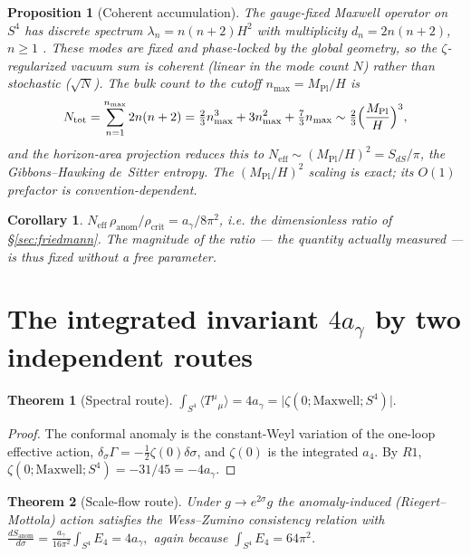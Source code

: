 \documentclass[11pt,a4paper]{article}
\newtheorem{theorem}{Theorem}
\newtheorem{proposition}{Proposition}
\newtheorem{corollary}{Corollary}
\theoremstyle{definition}
\theoremstyle{remark}
\newcommand{\ag}{a_\gamma}
\newcommand{\Mpl}{M_{\mathrm{Pl}}}
\newcommand{\avg}[1]{\langle #1\rangle}
\begin{document}
\begin{proposition}[Coherent accumulation]\label{prop:lift}
The gauge-fixed Maxwell operator on $S^4$ has discrete spectrum $\lambda_n=n(n+2)H^2$ with
multiplicity $d_n=2n(n+2)$, $n\ge1$ \cite{Allen,Higuchi}. These modes are fixed and phase-locked by
the global geometry, so the $\zeta$-regularized vacuum sum is \emph{coherent} (linear in the mode
count $N$) rather than stochastic ($\sqrt N$). The bulk count to the cutoff $n_{\max}=\Mpl/H$ is
\[
N_{\mathrm{tot}}=\sum_{n=1}^{n_{\max}}2n(n+2)=\tfrac23 n_{\max}^3+3n_{\max}^2+\tfrac73 n_{\max}
\sim\tfrac23\Bigl(\frac{\Mpl}{H}\Bigr)^3,
\]
and the horizon-area projection reduces this to
$N_{\mathrm{eff}}\sim(\Mpl/H)^2=S_{dS}/\pi$, the Gibbons--Hawking de~Sitter entropy. The
$(\Mpl/H)^2$ scaling is exact; its $O(1)$ prefactor is convention-dependent.
\end{proposition}

\begin{corollary}
$N_{\mathrm{eff}}\,\rho_{\mathrm{anom}}/\rho_{\mathrm{crit}}=\ag/8\pi^2$, i.e. the dimensionless
ratio of \S\ref{sec:friedmann}. The magnitude of the \emph{ratio} --- the quantity actually
measured --- is thus fixed without a free parameter.
\end{corollary}

\section{The integrated invariant $4\ag$ by two independent routes}\label{sec:invariant}
\begin{theorem}[Spectral route]\label{thm:zeta}
$\displaystyle\int_{S^4}\avg{T^\mu{}_\mu}=4\ag=\bigl\lvert\zeta(0;\mathrm{Maxwell};S^4)\bigr\rvert.$
\end{theorem}
\begin{proof}
The conformal anomaly is the constant-Weyl variation of the one-loop effective action,
$\delta_\sigma\Gamma=-\tfrac12\zeta(0)\delta\sigma$, and $\zeta(0)$ is the integrated $a_4$. By
$R1$, $\zeta(0;\mathrm{Maxwell};S^4)=-31/45=-4\ag$.
\end{proof}

\begin{theorem}[Scale-flow route]\label{thm:scaleflow}
Under $g\to e^{2\sigma}g$ the anomaly-induced (Riegert--Mottola) action satisfies the
Wess--Zumino consistency relation with
$\displaystyle\frac{dS_{\mathrm{anom}}}{d\sigma}=\frac{\ag}{16\pi^2}\int_{S^4}E_4=4\ag,$
again because $\int_{S^4}E_4=64\pi^2$. \cite{Riegert1984,Mottola}
\end{theorem}
\end{document}
